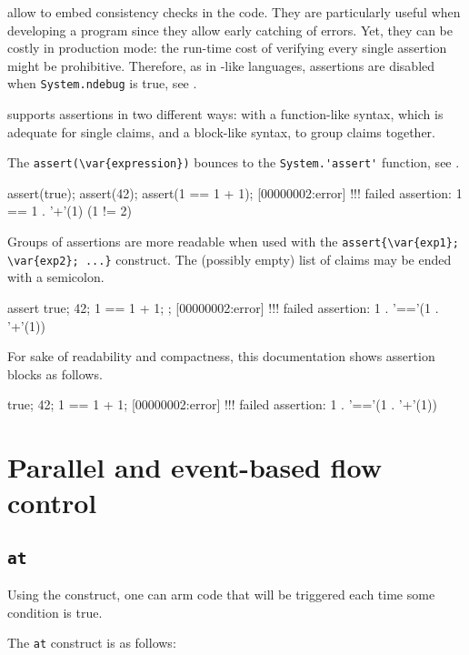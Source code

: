  allow to embed consistency checks in the
code.  They are particularly useful when developing a program since
they allow early catching of errors.  Yet, they can be costly in
production mode: the run-time cost of verifying every single assertion
might be prohibitive.  Therefore, as in \C-like languages, assertions
are disabled when \lstinline|System.ndebug| is true, see .

\us supports assertions in two different ways: with a function-like
syntax, which is adequate for single claims, and a block-like syntax,
to group claims together.

The \lstinline|assert(\var{expression})| bounces to the
\lstinline|System.'assert'| function, see .

\begin{urbiscript}
assert(true);
assert(42);
assert(1 == 1 + 1);
[00000002:error] !!! failed assertion: 1 == 1 . '+'(1) (1 != 2)
\end{urbiscript}

Groups of assertions are more readable when used with the
\lstinline|assert{\var{exp1}; \var{exp2}; ...}| construct.  The
(possibly empty) list of claims may be ended with a semicolon.

\begin{urbiscript}
assert
{
  true;
  42;
  1 == 1 + 1;
};
[00000002:error] !!! failed assertion: 1 . '=='(1 . '+'(1))
\end{urbiscript}

For sake of readability and compactness, this documentation shows
assertion blocks as follows.

\begin{urbiassert}
true;
42;
1 == 1 + 1;
[00000002:error] !!! failed assertion: 1 . '=='(1 . '+'(1))
\end{urbiassert}


\section{Parallel and event-based flow control}

\subsection{\lstinline'at'}
\label{sec:lang:at}
Using the  construct, one can arm code that will be
triggered each time some condition is true.

The \lstinline'at' construct is as follows:

